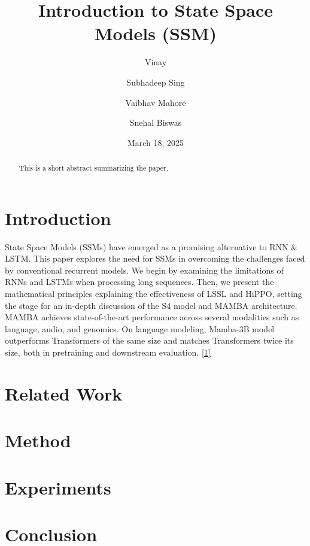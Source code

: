 \documentclass[11pt]{article}
\title{\textbf{Introduction to State Space Models (SSM)}}
\author[]{Vinay}
\author[]{Subhadeep Sing}
\author[]{Vaibhav Mahore}
\author[]{Snehal Biswas}
\affil[]{Indian Institute of Science, Bangalore \\
\texttt{\{vinay2023 ,shubadeeps ,mvaibhav ,snehalbiswas\}@iisc.ac.in}}
\date{March 18, 2025} %
\begin{document}
\maketitle
\begin{center}
    \begin{abstract}
        This is a short abstract summarizing the paper.
    \end{abstract}
\end{center}

\section{Introduction}
State Space Models (SSMs) have emerged as a promising alternative  to RNN \& LSTM.
This paper explores the need for SSMs in overcoming the challenges faced by conventional
recurrent models. We begin by examining the limitations of RNNs and LSTMs when 
processing long sequences. Then, we present the mathematical principles explaining
the effectiveness of LSSL and HiPPO, setting the stage for an in-depth discussion of the S4 model and  
MAMBA architecture. MAMBA achieves state-of-the-art performance across several modalities such as language, audio, and 
genomics. On language modeling, Mamba-3B model outperforms Transformers of the same size and matches Transformers 
twice its size, both in pretraining and downstream evaluation. \href{https://arxiv.org/abs/2110.13985.pdf}{[1]}


\section{Related Work}

\section{Method}

\section{Experiments}

\section{Conclusion}
\appendix
\end{document}

